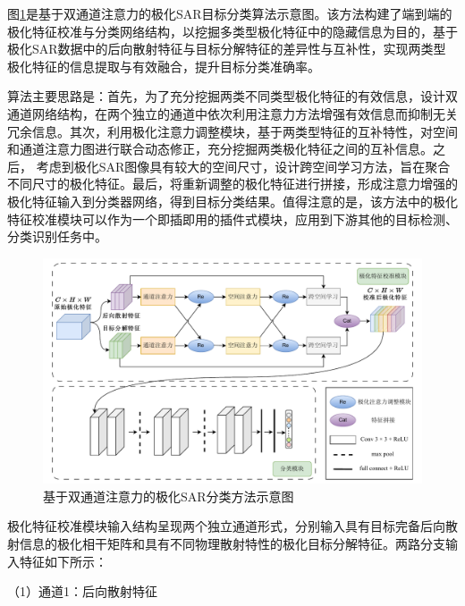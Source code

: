 图\ref{DPEN_framework}是基于双通道注意力的极化SAR目标分类算法示意图。该方法构建了端到端的极化特征校准与分类网络结构，以挖掘多类型极化特征中的隐藏信息为目的，基于极化SAR数据中的后向散射特征与目标分解特征的差异性与互补性，实现两类型极化特征的信息提取与有效融合，提升目标分类准确率。

算法主要思路是：首先，为了充分挖掘两类不同类型极化特征的有效信息，设计双通道网络结构，在两个独立的通道中依次利用注意力方法增强有效信息而抑制无关冗余信息。其次，利用极化注意力调整模块，基于两类型特征的互补特性，对空间和通道注意力图进行联合动态修正，充分挖掘两类极化特征之间的互补信息。之后， 考虑到极化SAR图像具有较大的空间尺寸，设计跨空间学习方法，旨在聚合不同尺寸的极化特征。最后，将重新调整的极化特征进行拼接，形成注意力增强的极化特征输入到分类器网络，得到目标分类结果。值得注意的是，该方法中的极化特征校准模块可以作为一个即插即用的插件式模块，应用到下游其他的目标检测、分类识别任务中。


\begin{figure}[ht!]
    \centering
    \includegraphics[width=14cm]{pic/chapter3/基于双通道注意力的极化SAR分类方法.pdf}
    \caption{基于双通道注意力的极化SAR分类方法示意图}
    \label{DPEN_framework}
\end{figure}

极化特征校准模块输入结构呈现两个独立通道形式，分别输入具有目标完备后向散射信息的极化相干矩阵和具有不同物理散射特性的极化目标分解特征。两路分支输入特征如下所示：

（1）通道1：后向散射特征


